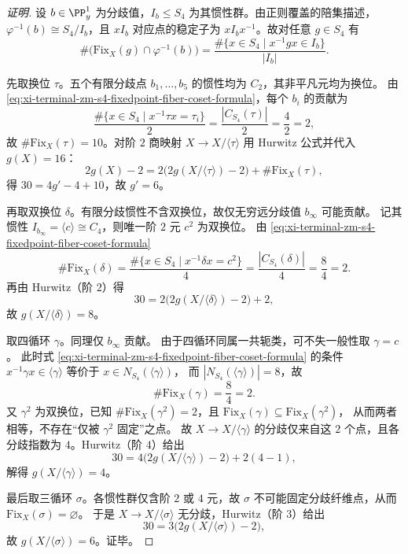 \begin{proof}[证明]
设 \(b\in \PP^1_y\) 为分歧值，\(I_b\le S_4\) 为其惯性群。由正则覆盖的陪集描述，
\(\varphi^{-1}(b)\cong S_4/I_b\)，且 \(xI_b\) 对应点的稳定子为 \(xI_bx^{-1}\)。故对任意 \(g\in S_4\) 有
\begin{equation}\label{eq:xi-terminal-zm-s4-fixedpoint-fiber-coset-formula}
\#\bigl(\mathrm{Fix}_X(g)\cap \varphi^{-1}(b)\bigr)
=\frac{\#\{x\in S_4\mid x^{-1}gx\in I_b\}}{|I_b|}.
\end{equation}

先取换位 \(\tau\)。五个有限分歧点 \(b_1,\dots,b_5\) 的惯性均为 \(C_2\)，其非平凡元均为换位。
由 \eqref{eq:xi-terminal-zm-s4-fixedpoint-fiber-coset-formula}，每个 \(b_i\) 的贡献为
\[
\frac{\#\{x\in S_4\mid x^{-1}\tau x=\tau_i\}}{2}
=\frac{|C_{S_4}(\tau)|}{2}
=\frac{4}{2}=2,
\]
故 \(\#\mathrm{Fix}_X(\tau)=10\)。对阶 \(2\) 商映射 \(X\to X/\langle\tau\rangle\) 用 Hurwitz 公式并代入 \(g(X)=16\)：
\[
2g(X)-2=2\bigl(2g(X/\langle\tau\rangle)-2\bigr)+\#\mathrm{Fix}_X(\tau),
\]
得 \(30=4g'-4+10\)，故 \(g'=6\)。

再取双换位 \(\delta\)。有限分歧惯性不含双换位，故仅无穷远分歧值 \(b_\infty\) 可能贡献。
记其惯性 \(I_{b_\infty}=\langle c\rangle\cong C_4\)，则唯一阶 \(2\) 元 \(c^2\) 为双换位。
由 \eqref{eq:xi-terminal-zm-s4-fixedpoint-fiber-coset-formula}
\[
\#\mathrm{Fix}_X(\delta)
=\frac{\#\{x\in S_4\mid x^{-1}\delta x=c^2\}}{4}
=\frac{|C_{S_4}(\delta)|}{4}
=\frac{8}{4}=2.
\]
再由 Hurwitz（阶 \(2\)）得
\[
30=2\bigl(2g(X/\langle\delta\rangle)-2\bigr)+2,
\]
故 \(g(X/\langle\delta\rangle)=8\)。

取四循环 \(\gamma\)。同理仅 \(b_\infty\) 贡献。
由于四循环同属一共轭类，可不失一般性取 \(\gamma=c\)。
此时式 \eqref{eq:xi-terminal-zm-s4-fixedpoint-fiber-coset-formula} 的条件 \(x^{-1}\gamma x\in \langle\gamma\rangle\) 等价于 \(x\in N_{S_4}(\langle\gamma\rangle)\)，
而 \(|N_{S_4}(\langle\gamma\rangle)|=8\)，故
\[
\#\mathrm{Fix}_X(\gamma)=\frac{8}{4}=2.
\]
又 \(\gamma^2\) 为双换位，已知 \(\#\mathrm{Fix}_X(\gamma^2)=2\)，且 \(\mathrm{Fix}_X(\gamma)\subseteq \mathrm{Fix}_X(\gamma^2)\)，
从而两者相等，不存在“仅被 \(\gamma^2\) 固定”之点。
故 \(X\to X/\langle\gamma\rangle\) 的分歧仅来自这 \(2\) 个点，且各分歧指数为 \(4\)。Hurwitz（阶 \(4\)）给出
\[
30=4\bigl(2g(X/\langle\gamma\rangle)-2\bigr)+2(4-1),
\]
解得 \(g(X/\langle\gamma\rangle)=4\)。

最后取三循环 \(\sigma\)。各惯性群仅含阶 \(2\) 或 \(4\) 元，故 \(\sigma\) 不可能固定分歧纤维点，从而 \(\mathrm{Fix}_X(\sigma)=\varnothing\)。
于是 \(X\to X/\langle\sigma\rangle\) 无分歧，Hurwitz（阶 \(3\)）给出
\[
30=3\bigl(2g(X/\langle\sigma\rangle)-2\bigr),
\]
故 \(g(X/\langle\sigma\rangle)=6\)。证毕。
\end{proof}

